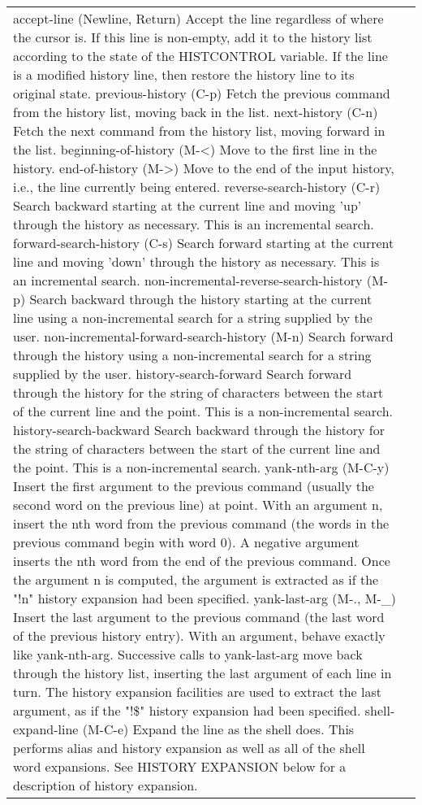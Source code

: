 \documentclass[11pt]{article}
\begin{document}
\begin{longtable}{p{}p{}}
{{{accept-line (Newline, Return)
Accept the line regardless of where the cursor is. If this line is non-empty, add it to the history list according to the state of the HISTCONTROL variable. If the line is a modified history line, then restore the history line to its original state.
previous-history (C-p)
Fetch the previous command from the history list, moving back in the list.
next-history (C-n)
Fetch the next command from the history list, moving forward in the list.
beginning-of-history (M-<)
Move to the first line in the history.
end-of-history (M->)
Move to the end of the input history, i.e., the line currently being entered.
reverse-search-history (C-r)
Search backward starting at the current line and moving 'up' through the history as necessary. This is an incremental search.
forward-search-history (C-s)
Search forward starting at the current line and moving 'down' through the history as necessary. This is an incremental search.
non-incremental-reverse-search-history (M-p)
Search backward through the history starting at the current line using a non-incremental search for a string supplied by the user.
non-incremental-forward-search-history (M-n)
Search forward through the history using a non-incremental search for a string supplied by the user.
history-search-forward
Search forward through the history for the string of characters between the start of the current line and the point. This is a non-incremental search.
history-search-backward
Search backward through the history for the string of characters between the start of the current line and the point. This is a non-incremental search.
yank-nth-arg (M-C-y)
Insert the first argument to the previous command (usually the second word on the previous line) at point. With an argument n, insert the nth word from the previous command (the words in the previous command begin with word 0). A negative argument inserts the nth word from the end of the previous command. Once the argument n is computed, the argument is extracted as if the "!n" history expansion had been specified.
yank-last-arg (M-., M-_)
Insert the last argument to the previous command (the last word of the previous history entry). With an argument, behave exactly like yank-nth-arg. Successive calls to yank-last-arg move back through the history list, inserting the last argument of each line in turn. The history expansion facilities are used to extract the last argument, as if the "!\$" history expansion had been specified.
shell-expand-line (M-C-e)
Expand the line as the shell does. This performs alias and history expansion as well as all of the shell word expansions. See HISTORY EXPANSION below for a description of history expansion.
}}}
\end{longtable}
\end{document}
